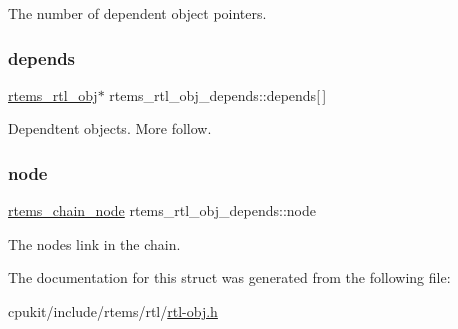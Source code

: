 The number of dependent object pointers. \mbox{\label{structrtems__rtl__obj__depends_a602786c011f7727ff4cfc006ac892d32}} 
\subsubsection{\texorpdfstring{depends}{depends}}
{\footnotesize\ttfamily \mbox{\hyperlink{structrtems__rtl__obj}{rtems\+\_\+rtl\+\_\+obj}}$\ast$ rtems\+\_\+rtl\+\_\+obj\+\_\+depends\+::depends\mbox{[}$\,$\mbox{]}}

Dependtent objects. More follow. \mbox{\label{structrtems__rtl__obj__depends_a06c2e61abfc88d63566c5df94cd73715}} 
\subsubsection{\texorpdfstring{node}{node}}
{\footnotesize\ttfamily \mbox{\hyperlink{structChain__Node__struct}{rtems\+\_\+chain\+\_\+node}} rtems\+\_\+rtl\+\_\+obj\+\_\+depends\+::node}

The node\textquotesingle{}s link in the chain. 

The documentation for this struct was generated from the following file\+:\begin{DoxyCompactItemize}
\item 
cpukit/include/rtems/rtl/\mbox{\hyperlink{rtl-obj_8h}{rtl-\/obj.\+h}}\end{DoxyCompactItemize}
